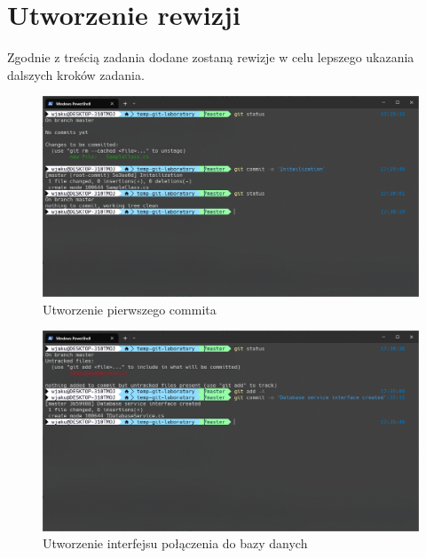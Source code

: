 \documentclass{article}
\begin{document}
\section{Utworzenie rewizji}

Zgodnie z treścią zadania dodane zostaną rewizje w celu lepszego ukazania dalszych kroków zadania.

\vspace*{\fill}
\begin{figure}[!h]
    \caption{Utworzenie pierwszego commita}
    \centerline{\includegraphics [scale=0.5]{initialization-commit.PNG}}
    \label{fig:label}
\end{figure}
\vspace*{\fill}
\newpage

\vspace*{\fill}
\begin{figure}[!h]
    \caption{Utworzenie interfejsu połączenia do bazy danych}
    \centerline{\includegraphics [scale=0.5]{database-service-interface.PNG}}
    \label{fig:label}
\end{figure}
\vspace*{\fill}
\newpage
\end{document}
